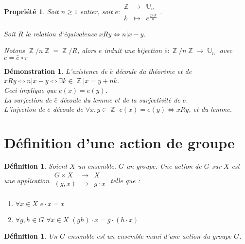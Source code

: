 \documentclass[a4paper, oneside]{report}
\theoremstyle{break}
\newtheorem{defi}[thm]{Définition}
\newtheorem{propr}[thm]{Propriété}
\newtheorem*{demo}{Démonstration}
\newcommand{\x}{\times}
\DeclareMathOperator{\Z}{\mathbb{Z}}
\DeclareMathOperator{\U}{\mathbb{U}}
\begin{document}
\begin{propr}
	Soit $n\geq 1$ entier, soit $e:\begin{array}{lll}
	\Z &\rightarrow &\U_n\\
	k&\mapsto&e^{\frac{2\pi i k}{n}}
	\end{array}$.
	
	Soit $R$ la relation d'équivalence $xRy\Leftrightarrow n|x-y$.
	
	Notons $\Z/n\Z=\Z/R$, alors $e$ induit une bijection $\bar{e}:\Z/n\Z \rightarrow \U_n$ avec $e=\bar{e}\circ \pi$
\end{propr}

\begin{demo}
	L'existence de $\bar{e}$ découle du théorème et de $xRy \Leftrightarrow n|x-y \Leftrightarrow \exists k\in \Z | x=y+nk$.\\
	Ceci implique que $e(x)=e(y)$.\\
	La surjection de $\bar{e}$ découle du lemme et de la surjectivité de $e$.\\
	L'injection de $\bar{e}$ découle de $\forall x,y\in \Z$ $e(x)=e(y)\Leftrightarrow xRy$, et du lemme.
\end{demo}

\section{Définition d'une action de groupe}

\begin{defi} 
	Soient $X$ un ensemble, $G$ un groupe. Une action de $G$ sur $X$ est une application $\begin{array}{lll}
	G\x X &\rightarrow & X\\
	(g,x)&\rightarrow & g \cdot x\\
	\end{array}$ telle que :
	\begin{enumerate}
	\item $\forall x\in X$ $e \cdot x=x$
	\item $\forall g,h\in G$ $\forall x\in X$ $(gh) \cdot x=g \cdot (h \cdot x)$
	\end{enumerate}
\end{defi}

\begin{defi}
	Un $G$-ensemble est un ensemble muni d'une action du groupe $G$.	
\end{defi}
\end{document}
